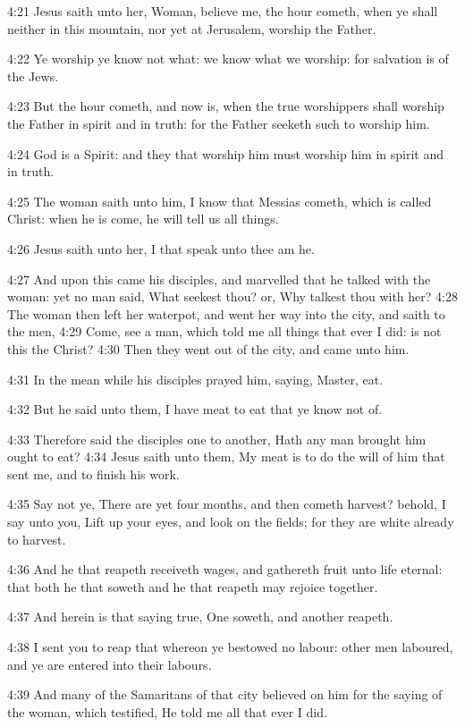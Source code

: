 4:21 Jesus saith unto her, Woman, believe me, the hour cometh, when ye
shall neither in this mountain, nor yet at Jerusalem, worship the
Father.

4:22 Ye worship ye know not what: we know what we worship: for
salvation is of the Jews.

4:23 But the hour cometh, and now is, when the true worshippers shall
worship the Father in spirit and in truth: for the Father seeketh such
to worship him.

4:24 God is a Spirit: and they that worship him must worship him in
spirit and in truth.

4:25 The woman saith unto him, I know that Messias cometh, which is
called Christ: when he is come, he will tell us all things.

4:26 Jesus saith unto her, I that speak unto thee am he.

4:27 And upon this came his disciples, and marvelled that he talked
with the woman: yet no man said, What seekest thou? or, Why talkest
thou with her?  4:28 The woman then left her waterpot, and went her
way into the city, and saith to the men, 4:29 Come, see a man, which
told me all things that ever I did: is not this the Christ?  4:30 Then
they went out of the city, and came unto him.

4:31 In the mean while his disciples prayed him, saying, Master, eat.

4:32 But he said unto them, I have meat to eat that ye know not of.

4:33 Therefore said the disciples one to another, Hath any man brought
him ought to eat?  4:34 Jesus saith unto them, My meat is to do the
will of him that sent me, and to finish his work.

4:35 Say not ye, There are yet four months, and then cometh harvest?
behold, I say unto you, Lift up your eyes, and look on the fields; for
they are white already to harvest.

4:36 And he that reapeth receiveth wages, and gathereth fruit unto
life eternal: that both he that soweth and he that reapeth may rejoice
together.

4:37 And herein is that saying true, One soweth, and another reapeth.

4:38 I sent you to reap that whereon ye bestowed no labour: other men
laboured, and ye are entered into their labours.

4:39 And many of the Samaritans of that city believed on him for the
saying of the woman, which testified, He told me all that ever I did.

